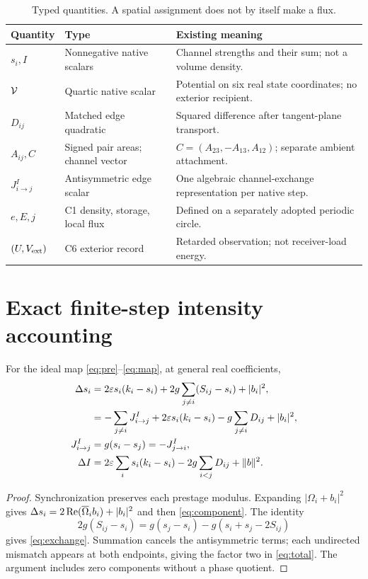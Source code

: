 \begin{table}[htbp]\centering\small
\caption{Typed quantities. A spatial assignment does not by itself make a flux.}\label{tab:types}
\begin{tabularx}{\textwidth}{@{}p{}YY@{}}\toprule
Quantity & Type & Existing meaning\\\midrule
$s_i,I$ & Nonnegative native scalars & Channel strengths and their sum; not a volume density.\\
$\mathcal V$ & Quartic native scalar & Potential on six real state coordinates; no exterior recipient.\\
$D_{ij}$ & Matched edge quadratic & Squared difference after tangent-plane transport.\\
$A_{ij},C$ & Signed pair areas; channel vector & $C=(A_{23},-A_{13},A_{12})$; separate ambient attachment.\\
$J^I_{i\to j}$ & Antisymmetric edge scalar & One algebraic channel-exchange representation per native step.\\
$e,E,j$ & C1 density, storage, local flux & Defined on a separately adopted periodic circle.\\
$(U,V_{\rm ext})$ & C6 exterior record & Retarded observation; not receiver-load energy.\\\bottomrule
\end{tabularx}
\end{table}

\section{Exact finite-step intensity accounting}
\begin{proposition}\label{prop:intensity}
For the ideal map \eqref{eq:pre}--\eqref{eq:map}, at general real coefficients,
\begin{align}
 \Delta s_i&=2\varepsilon s_i(k_i-s_i)+2g\sum_{j\ne i}(S_{ij}-s_i)+|b_i|^2,\label{eq:component}\\
 &= -\sum_{j\ne i}J^I_{i\to j}+2\varepsilon s_i(k_i-s_i)
       -g\sum_{j\ne i}D_{ij}+|b_i|^2,\label{eq:exchange}\\
 J^I_{i\to j}&=g(s_i-s_j)=-J^I_{j\to i},\notag\\
 \Delta I&=2\varepsilon\sum_i s_i(k_i-s_i)-2g\sum_{i<j}D_{ij}+\|b\|^2.\label{eq:total}
\end{align}
\end{proposition}
\begin{proof}
Synchronization preserves each prestage modulus. Expanding $|\Omega_i+b_i|^2$ gives $\Delta s_i=2\operatorname{Re}(\overline\Omega_i b_i)+|b_i|^2$ and then \eqref{eq:component}. The identity
\[
2g(S_{ij}-s_i)=g(s_j-s_i)-g(s_i+s_j-2S_{ij})
\]
gives \eqref{eq:exchange}. Summation cancels the antisymmetric terms; each undirected mismatch appears at both endpoints, giving the factor two in \eqref{eq:total}. The argument includes zero components without a phase quotient.
\end{proof}

